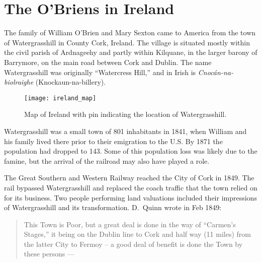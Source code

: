 \chapter{The O'Briens in Ireland}

The family of William O'Brien and Mary Sexton came to America from the town of Watergrasshill in County Cork, Ireland.\cite{Edward2OBrienNaturalization:1} The village is situated mostly within the civil parish of Ardnageehy and partly within Kilquane, in the larger barony of Barrymore, on the main road between Cork and Dublin.\cite{TopographicalDictionary} The name Watergrasshill was originally ``Watercress Hill,'' and in Irish is \textit{Cnoc\'{a}n-na-biolraighe} (Knockaun-na-billery).\cite{LocalNames}

\begin{figure}[htbp]
	\centering
	\texttt{[image: ireland\_map]}
	\caption{Map of Ireland with pin indicating the location of Watergrasshill.}
	\label{fig:IrelandMap}
\end{figure}

Watergrasshill was a small town of 801 inhabitants in 1841, when William and his family lived there prior to their emigration to the U.S. By 1871 the population had dropped to 143.\cite{Population} Some of this population loss was likely due to the famine, but the arrival of the railroad may also have played a role. 

The Great Southern and Western Railway reached the City of Cork in 1849.\cite{Bianconi:1} The rail bypassed Watergrasshill and replaced the coach traffic that the town relied on for its business. Two people performing land valuations included their impressions of Watergrasshill and its transformation. D.\ Quinn wrote in Feb 1849:

\begin{quote}
	This Town is Poor, but a great deal is done in the way of ``Carmen's Stages,'' it being on the Dublin line to Cork and half way (11 miles) from the latter City to Fermoy -- a good deal of benefit is done the Town by these persons ---\cite{HouseIntro:1}
\end{quote}

